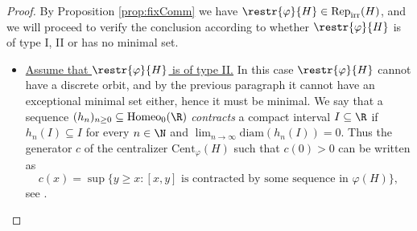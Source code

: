 \documentclass[reqno]{amsart}
\begin{document}
\begin{proof}
By Proposition \ref{prop:fixComm} we have $\restr{\varphi}{H} \in \mathrm{Rep}_\mathrm{irr}(H)$, and we will proceed to verify the conclusion according to whether $\restr{\varphi}{H}$ is of type I, II or has no minimal set.

\begin{itemize}
	\item \underline{Assume that $\restr{\varphi}{H}$ is of type II.} In this case $\restr{\varphi}{H}$  cannot have a discrete orbit, and by the previous paragraph it cannot have an exceptional minimal set either, hence it must be minimal. We say that a sequence $(h_n)_{n \geq 0} \subseteq \mathrm{Homeo}_0(\R)$ \emph{contracts} a compact interval $I \subseteq \R$ if $h_n(I) \subseteq I$ for every $n \in \N$ and $\lim_{n \to \infty} \mathrm{diam}(h_n(I)) = 0$. Thus the generator $c$ of the centralizer $\mathrm{Cent}_\varphi(H)$ such that $c(0) > 0$ can be written as
\[
	c(x) = \sup\{y \geq x : [x,y] \text{ is contracted by some sequence in }\varphi(H)\},
\]
see \cite[Section 5.2]{Ghys2001}.


\end{itemize}
\end{proof}
\end{document}
